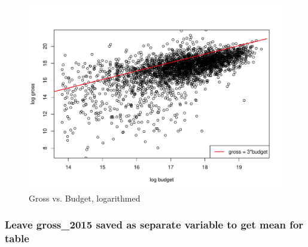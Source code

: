 \documentclass[
]{article}
\begin{document}
\begin{figure}[h]

{\centering \includegraphics[width=0.5\linewidth]{./datavisual} 

}

\caption{Gross vs. Budget, logarithmed}\label{fig:unnamed-chunk-3}
\end{figure}

\hypertarget{leave-gross_2015-saved-as-separate-variable-to-get-mean-for-table}{%
\subsubsection{Leave gross\_2015 saved as separate variable to get mean
for
table}\label{leave-gross_2015-saved-as-separate-variable-to-get-mean-for-table}}
\end{document}
